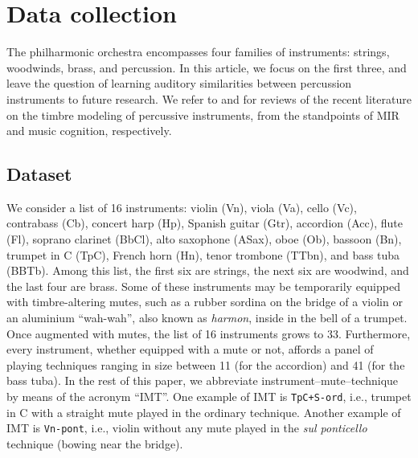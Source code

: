 \documentclass{bmcart}
\makeatletter
\newcommand*{\ie}{i.e.,\@\xspace}
\newcommand{\nmu}{}
\makeatother
\begin{document}
\section*{\nmu Data collection}
\label{sec:data-collection}

The philharmonic orchestra encompasses four families of instruments: strings, woodwinds, brass, and percussion.
In this article, we focus on the first three, and leave the question of learning auditory similarities between percussion instruments to future research.
We refer to \cite{wu2018taslp} and \cite{pearce2019appliedsciences} for reviews of the recent literature on the timbre modeling of percussive instruments, from the standpoints of MIR and music cognition, respectively.

\subsection*{Dataset}
We consider a list of 16 instruments: violin (Vn), viola (Va), cello (Vc), contrabass (Cb), concert harp (Hp), Spanish guitar (Gtr), accordion (Acc), flute (Fl), soprano clarinet (BbCl), alto saxophone (ASax), oboe (Ob), bassoon (Bn), trumpet in C (TpC), French horn (Hn), tenor trombone (TTbn), and bass tuba (BBTb).
Among this list, the first six are strings, the next six are woodwind, and the last four are brass.
Some of these instruments may be temporarily equipped with timbre-altering mutes, such as a rubber sordina on the bridge of a violin or an aluminium ``wah-wah'', also known as \emph{harmon}, inside in the bell of a trumpet.
Once augmented with mutes, the list of 16 instruments grows to 33.
Furthermore, every instrument, whether equipped with a mute or not, affords a panel of playing techniques ranging in size between 11 (for the accordion) and 41 (for the bass tuba).
In the rest of this paper, we abbreviate instrument--mute--technique by means of the acronym ``IMT''.
One example of IMT is \texttt{TpC+S-ord}, \ie{} trumpet in C with a straight mute played in the ordinary technique.
Another example of IMT is \texttt{Vn-pont}, \ie{} violin without any mute played in the \emph{sul ponticello} technique (bowing near the bridge).
\end{document}
